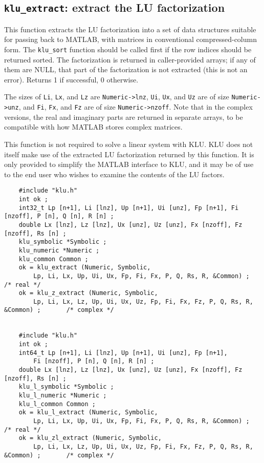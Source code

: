 \documentclass[11pt]{article}
\begin{document}
\subsection{{\tt klu\_extract}: extract the LU factorization}

This function extracts the LU factorization into a set of data structures
suitable for passing back to MATLAB, with matrices in conventional
compressed-column form.  The {\tt klu\_sort} function should be called first if
the row indices should be returned sorted.  The factorization is returned in
caller-provided arrays; if any of them are NULL, that part of the factorization
is not extracted (this is not an error).  Returns 1 if successful, 0 otherwise.

The sizes of {\tt Li}, {\tt Lx}, and {\tt Lz} are {\tt Numeric->lnz},
{\tt Ui}, {\tt Ux}, and {\tt Uz} are of size {\tt Numeric->unz}, and
{\tt Fi}, {\tt Fx}, and {\tt Fz} are of size {\tt Numeric->nzoff}.
Note that in the complex versions, the real and imaginary parts are returned
in separate arrays, to be compatible with how MATLAB stores complex matrices.

This function is not required to solve a linear system with KLU.  KLU does not
itself make use of the extracted LU factorization returned by this function.
It is only provided to simplify the MATLAB interface to KLU, and it may be of
use to the end user who wishes to examine the contents of the LU factors.

{\footnotesize
\begin{verbatim}
    #include "klu.h"
    int ok ;
    int32_t Lp [n+1], Li [lnz], Up [n+1], Ui [unz], Fp [n+1], Fi [nzoff], P [n], Q [n], R [n] ;
    double Lx [lnz], Lz [lnz], Ux [unz], Uz [unz], Fx [nzoff], Fz [nzoff], Rs [n] ;
    klu_symbolic *Symbolic ;
    klu_numeric *Numeric ;
    klu_common Common ;
    ok = klu_extract (Numeric, Symbolic,
        Lp, Li, Lx, Up, Ui, Ux, Fp, Fi, Fx, P, Q, Rs, R, &Common) ;                   /* real */
    ok = klu_z_extract (Numeric, Symbolic,
        Lp, Li, Lx, Lz, Up, Ui, Ux, Uz, Fp, Fi, Fx, Fz, P, Q, Rs, R, &Common) ;       /* complex */


    #include "klu.h"
    int ok ;
    int64_t Lp [n+1], Li [lnz], Up [n+1], Ui [unz], Fp [n+1],
        Fi [nzoff], P [n], Q [n], R [n] ;
    double Lx [lnz], Lz [lnz], Ux [unz], Uz [unz], Fx [nzoff], Fz [nzoff], Rs [n] ;
    klu_l_symbolic *Symbolic ;
    klu_l_numeric *Numeric ;
    klu_l_common Common ;
    ok = klu_l_extract (Numeric, Symbolic,
        Lp, Li, Lx, Up, Ui, Ux, Fp, Fi, Fx, P, Q, Rs, R, &Common) ;                   /* real */
    ok = klu_zl_extract (Numeric, Symbolic,
        Lp, Li, Lx, Lz, Up, Ui, Ux, Uz, Fp, Fi, Fx, Fz, P, Q, Rs, R, &Common) ;       /* complex */
\end{verbatim}
}
\end{document}
